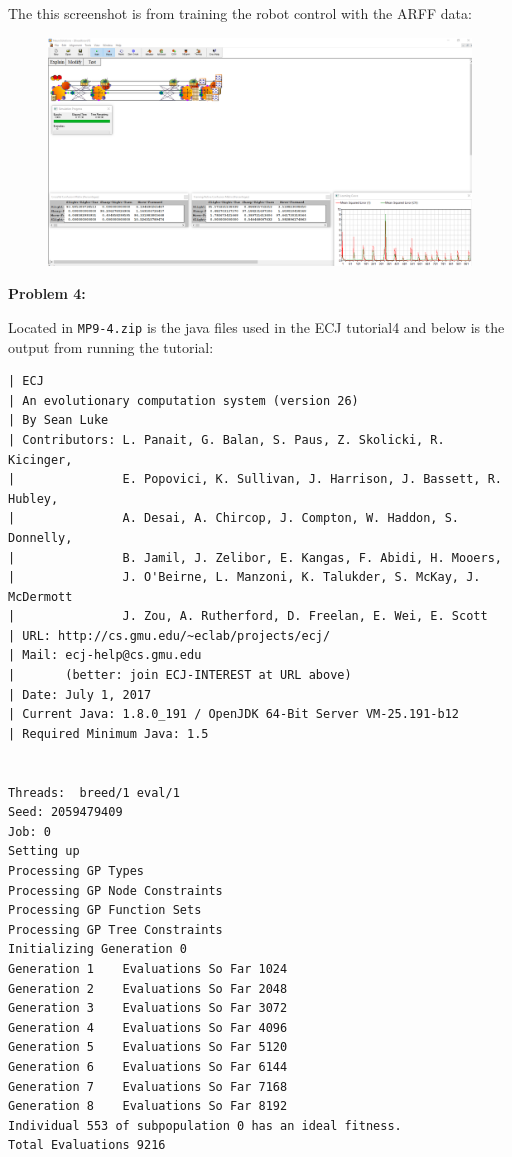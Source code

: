 \documentclass{amsart}
\theoremstyle{definition}
\begin{document}
The this screenshot is from training the robot control with the ARFF data:

\begin{figure}[h!]
    \includegraphics[width=0.9\linewidth]{mp9-3_1}
\end{figure}


\bigbreak
\textbf{Problem 4:}
\bigbreak

Located in {\tt MP9-4.zip} is the java files used in the ECJ tutorial4 and below is the output from running the tutorial:

\begin{verbatim}
| ECJ
| An evolutionary computation system (version 26)
| By Sean Luke
| Contributors: L. Panait, G. Balan, S. Paus, Z. Skolicki, R. Kicinger,
|               E. Popovici, K. Sullivan, J. Harrison, J. Bassett, R. Hubley,
|               A. Desai, A. Chircop, J. Compton, W. Haddon, S. Donnelly,
|               B. Jamil, J. Zelibor, E. Kangas, F. Abidi, H. Mooers,
|               J. O'Beirne, L. Manzoni, K. Talukder, S. McKay, J. McDermott
|               J. Zou, A. Rutherford, D. Freelan, E. Wei, E. Scott
| URL: http://cs.gmu.edu/~eclab/projects/ecj/
| Mail: ecj-help@cs.gmu.edu
|       (better: join ECJ-INTEREST at URL above)
| Date: July 1, 2017
| Current Java: 1.8.0_191 / OpenJDK 64-Bit Server VM-25.191-b12
| Required Minimum Java: 1.5


Threads:  breed/1 eval/1
Seed: 2059479409 
Job: 0
Setting up
Processing GP Types
Processing GP Node Constraints
Processing GP Function Sets
Processing GP Tree Constraints
Initializing Generation 0
Generation 1	Evaluations So Far 1024
Generation 2	Evaluations So Far 2048
Generation 3	Evaluations So Far 3072
Generation 4	Evaluations So Far 4096
Generation 5	Evaluations So Far 5120
Generation 6	Evaluations So Far 6144
Generation 7	Evaluations So Far 7168
Generation 8	Evaluations So Far 8192
Individual 553 of subpopulation 0 has an ideal fitness.
Total Evaluations 9216
\end{verbatim}
\end{document}
